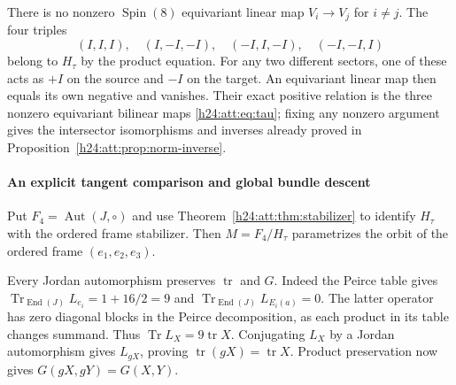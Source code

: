 There is no nonzero $\operatorname{Spin}(8)$ equivariant linear map
$V_i\to V_j$ for $i\ne j$. The four triples
\[
 (I,I,I),\quad(I,-I,-I),\quad(-I,I,-I),\quad(-I,-I,I)
\]
belong to $H_\tau$ by the product equation. For any two different
sectors, one of these acts as $+I$ on the source and $-I$ on the
target. An equivariant linear map then equals its own negative and
vanishes. Their exact positive relation is the three nonzero
equivariant bilinear maps \eqref{h24:att:eq:tau}; fixing any nonzero
argument gives the intersector isomorphisms and inverses already
proved in Proposition~\ref{h24:att:prop:norm-inverse}.

\paragraph{An explicit tangent comparison and global bundle descent}

Put $F_4=\operatorname{Aut}(J,\circ)$ and use
Theorem~\ref{h24:att:thm:stabilizer} to identify $H_\tau$ with the ordered
frame stabilizer. Then $M=F_4/H_\tau$ parametrizes the orbit of the
ordered frame $(e_1,e_2,e_3)$.

Every Jordan automorphism preserves $\operatorname{tr}$ and $G$.
Indeed the Peirce table gives
$\operatorname{Tr}_{\operatorname{End}(J)}L_{e_i}=1+16/2=9$ and
$\operatorname{Tr}_{\operatorname{End}(J)}L_{E_i(a)}=0$.
The latter operator has zero diagonal blocks in the Peirce
decomposition, as each product in its table changes summand.
Thus $\operatorname{Tr}L_X=9\operatorname{tr}X$.
Conjugating $L_X$ by a Jordan automorphism gives $L_{gX}$, proving
$\operatorname{tr}(gX)=\operatorname{tr}X$. Product preservation now
gives $G(gX,gY)=G(X,Y)$.

